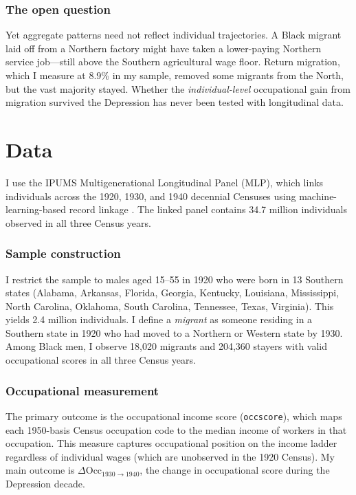\documentclass[12pt]{article}
\begin{document}
\subsubsection*{The open question} Yet aggregate patterns need not reflect individual trajectories. A Black migrant laid off from a Northern factory might have taken a lower-paying Northern service job---still above the Southern agricultural wage floor. Return migration, which I measure at 8.9\% in my sample, removed some migrants from the North, but the vast majority stayed. Whether the \textit{individual-level} occupational gain from migration survived the Depression has never been tested with longitudinal data.


\section{Data}

I use the IPUMS Multigenerational Longitudinal Panel (MLP), which links individuals across the 1920, 1930, and 1940 decennial Censuses using machine-learning-based record linkage \citep{helgertz2023}. The linked panel contains 34.7 million individuals observed in all three Census years.

\subsubsection*{Sample construction} I restrict the sample to males aged 15--55 in 1920 who were born in 13 Southern states (Alabama, Arkansas, Florida, Georgia, Kentucky, Louisiana, Mississippi, North Carolina, Oklahoma, South Carolina, Tennessee, Texas, Virginia). This yields 2.4 million individuals. I define a \textit{migrant} as someone residing in a Southern state in 1920 who had moved to a Northern or Western state by 1930. Among Black men, I observe 18,020 migrants and 204,360 stayers with valid occupational scores in all three Census years.

\subsubsection*{Occupational measurement} The primary outcome is the occupational income score (\texttt{occscore}), which maps each 1950-basis Census occupation code to the median income of workers in that occupation. This measure captures occupational position on the income ladder regardless of individual wages (which are unobserved in the 1920 Census). My main outcome is $\Delta \text{Occ}_{1930 \rightarrow 1940}$, the change in occupational score during the Depression decade.
\end{document}

